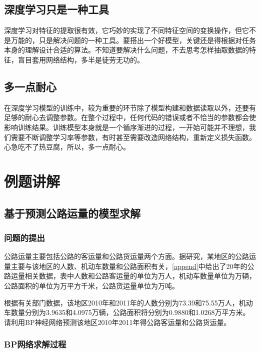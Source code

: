 \documentclass[bwprint]{cumcmthesis}
\begin{document}
\subsection{深度学习只是一种工具}

深度学习对特征的提取很有效，它巧妙的实现了不同特征空间的变换操作，但它不是万能的，只是解决问题的一种工具。要搭出一个好模型，关键还是得根据对任务本身的理解设计合适的算法。不知道要解决什么问题，不去思考怎样抽取数据的特征，盲目套用网络结构，多半是徒劳无功的。

\subsection{多一点耐心}

在深度学习模型的训练中，较为重要的环节除了模型构建和数据读取以外，还要有足够的耐心去调整参数。在整个过程中，任何代码的错误或者不恰当的参数都会使影响训练结果。训练模型本身就是一个循序渐进的过程，一开始可能并不理想，我们需要不断调整学习率等参数，有时甚至需要改造网络结构，重新定义损失函数。心急吃不了热豆腐，所以，多一点耐心。



\section{例题讲解}

\subsection{基于预测公路运量的模型求解}

\subsubsection{问题的提出}

公路运量主要包括公路的客运量和公路货运量两个方面。据研究，某地区的公路运量主要与该地区的人数、机动车数量和公路面积有关，\ref{append}中给出了20年的公路运量相关数据，表中人数和公路客运量的单位为万人，机动车数量单位为万辆，公路面积的单位为万平方千米，公路货运量单位为万吨。

根据有关部门数据，该地区2010年和2011年的人数分别为73.39和75.55万人，机动车数量分别为3.9635和4.0975万辆，公路面积将分别为0.9880和1.0268万平方米。请利用BP神经网络预测该地区2010年2011年得公路客运量和公路货运量。

\subsubsection{BP网络求解过程}
\end{document}
